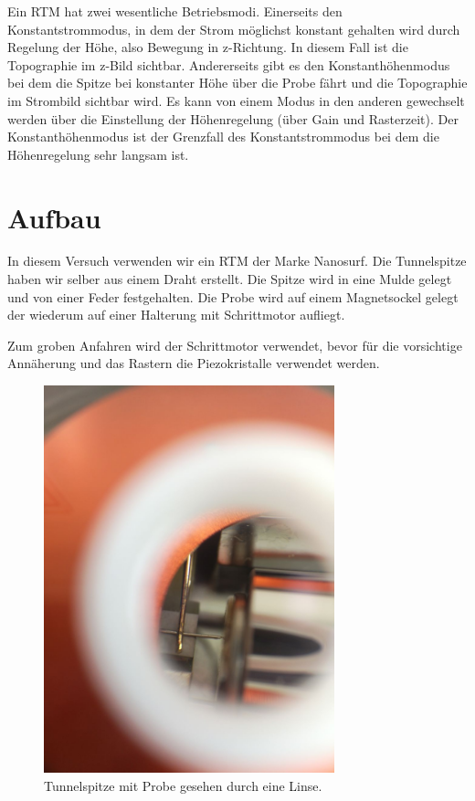 Ein RTM hat zwei wesentliche Betriebsmodi. Einerseits den Konstantstrommodus, in dem der Strom möglichst konstant gehalten wird durch Regelung der Höhe, also Bewegung in z-Richtung. In diesem Fall ist die Topographie im z-Bild sichtbar. Andererseits gibt es den Konstanthöhenmodus bei dem die Spitze bei konstanter Höhe über die Probe fährt und die Topographie im Strombild sichtbar wird. Es kann von einem Modus in den anderen gewechselt werden über die Einstellung der Höhenregelung (über Gain und Rasterzeit). Der Konstanthöhenmodus ist der Grenzfall des Konstantstrommodus bei dem die Höhenregelung sehr langsam ist.


\section{Aufbau}

In diesem Versuch verwenden wir ein RTM der Marke Nanosurf. Die Tunnelspitze haben wir selber aus einem Draht erstellt. Die Spitze wird in eine Mulde gelegt und von einer Feder festgehalten. Die Probe wird auf einem Magnetsockel gelegt der wiederum auf einer Halterung mit Schrittmotor aufliegt.

Zum groben Anfahren wird der Schrittmotor verwendet, bevor für die vorsichtige Annäherung und das Rastern die Piezokristalle verwendet werden. 


\begin{figure}[H]
\centering
\includegraphics[width=0.75\textwidth,clip,trim=5cm 1cm 0 5cm]{../RTM.jpg}
\caption{Tunnelspitze mit Probe gesehen durch eine Linse.}
\label{RTM}
\end{figure}

